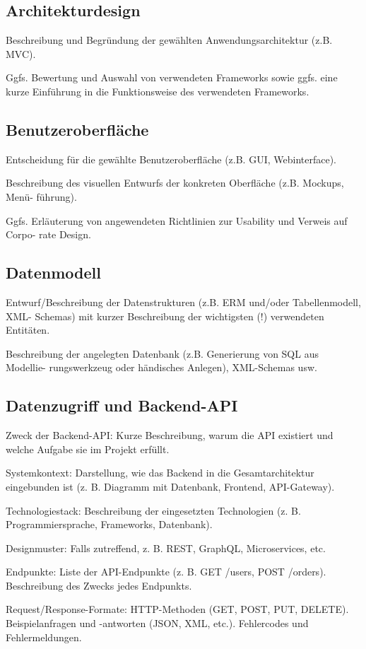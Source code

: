 \documentclass[a4paper,12pt]{article}
\begin{document}
\subsection{Architekturdesign}
Beschreibung und Begründung der gewählten
Anwendungsarchitektur (z.B. MVC).

Ggfs. Bewertung und Auswahl von verwendeten Frameworks sowie ggfs. eine kurze
Einführung in die Funktionsweise des verwendeten Frameworks.

\subsection{Benutzeroberfläche}
Entscheidung für die gewählte
Benutzeroberfläche (z.B. GUI, Webinterface).

Beschreibung des visuellen Entwurfs der konkreten Oberfläche (z.B. Mockups,
Menü- führung).

Ggfs. Erläuterung von angewendeten Richtlinien zur Usability und Verweis auf
Corpo- rate Design.

\subsection{Datenmodell}
Entwurf/Beschreibung der Datenstrukturen (z.B. ERM
und/oder Tabellenmodell, XML- Schemas) mit kurzer Beschreibung der wichtigsten
(!) verwendeten Entitäten.

Beschreibung der angelegten Datenbank (z.B. Generierung von SQL aus Modellie-
rungswerkzeug oder händisches Anlegen), XML-Schemas usw.

\subsection{Datenzugriff und Backend-API}
Zweck der Backend-API: Kurze Beschreibung, warum die API existiert und welche
Aufgabe sie im Projekt erfüllt.

Systemkontext: Darstellung, wie das Backend in die Gesamtarchitektur
eingebunden ist (z. B. Diagramm mit Datenbank, Frontend, API-Gateway).

Technologiestack: Beschreibung der eingesetzten Technologien (z. B.
Programmiersprache, Frameworks, Datenbank).

Designmuster: Falls zutreffend, z. B. REST, GraphQL, Microservices, etc.

Endpunkte: Liste der API-Endpunkte (z. B. GET /users, POST /orders).
Beschreibung des Zwecks jedes Endpunkts.

Request/Response-Formate: HTTP-Methoden (GET, POST, PUT, DELETE).
Beispielanfragen und -antworten (JSON, XML, etc.).  Fehlercodes und
Fehlermeldungen.
\end{document}
